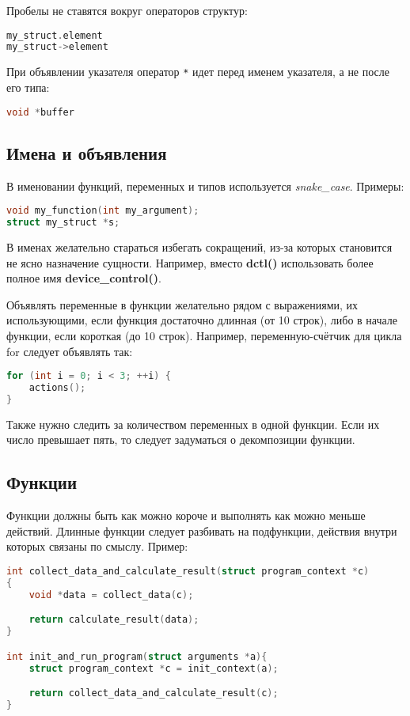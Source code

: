 Пробелы не ставятся вокруг операторов структур:
\begin{lstlisting}[language=C]
my_struct.element
my_struct->element
\end{lstlisting}

При объявлении указателя оператор \verb|*| идет перед именем указателя, а не после его типа:
\begin{lstlisting}[language=C]
void *buffer
\end{lstlisting}

\subsection*{Имена и объявления}
В именовании функций, переменных и типов используется \textit{snake\_case}. Примеры:
\begin{lstlisting}[language=C]
void my_function(int my_argument);
struct my_struct *s;
\end{lstlisting}

В именах желательно стараться избегать сокращений, из-за которых становится не ясно назначение сущности. Например, вместо \textbf{dctl()} использовать более полное имя \textbf{device\_control()}.

\linespace

Объявлять переменные в функции желательно рядом с выражениями, их использующими, если функция достаточно длинная (от 10 строк), либо в начале функции, если короткая (до 10 строк). Например, переменную-счётчик для цикла for следует объявлять так:
\begin{lstlisting}[language=C]
for (int i = 0; i < 3; ++i) {
    actions();
}
\end{lstlisting}

Также нужно следить за количеством переменных в одной функции. Если их число превышает пять, то следует задуматься о декомпозиции функции.

\subsection*{Функции}

Функции должны быть как можно короче и выполнять как можно меньше действий. Длинные функции следует разбивать на подфункции, действия внутри которых связаны по смыслу. Пример:
\begin{lstlisting}[language=C]
int collect_data_and_calculate_result(struct program_context *c)
{
    void *data = collect_data(c);

    return calculate_result(data);
}

int init_and_run_program(struct arguments *a){
    struct program_context *c = init_context(a);

    return collect_data_and_calculate_result(c);
}
\end{lstlisting}

